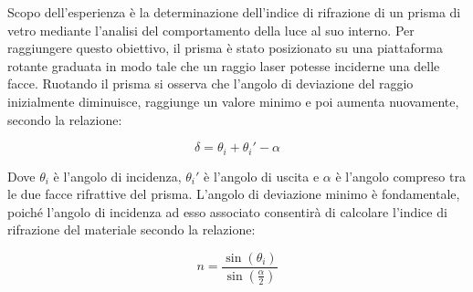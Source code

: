 Scopo dell'esperienza è la determinazione dell'indice di rifrazione di un prisma di vetro mediante l'analisi del comportamento della luce al suo interno. Per raggiungere questo obiettivo, il prisma è stato posizionato su una piattaforma rotante graduata in modo tale che un raggio laser potesse inciderne una delle facce. Ruotando il prisma si osserva che l'angolo di deviazione del raggio inizialmente diminuisce, raggiunge un valore minimo e poi aumenta nuovamente, secondo la relazione:

\begin{equation}
	\delta=\theta_i+\theta_i'-\alpha
\end{equation}

Dove $\theta_i$ è l'angolo di incidenza, $\theta_i'$ è l'angolo di uscita e $\alpha$ è l'angolo compreso tra le due facce rifrattive del prisma. L'angolo di deviazione minimo è fondamentale, poiché l'angolo di incidenza ad esso associato consentirà di calcolare l'indice di rifrazione del materiale secondo la relazione:

\begin{equation}
	n=\frac{\sin(\theta_i)}{\sin(\frac{\alpha}{2})}
\end{equation}